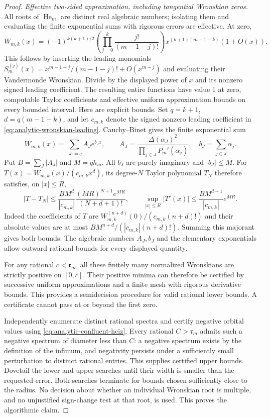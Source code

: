 \begin{proof}
\emph{Effective two-sided approximation, including tangential
Wronskian zeros.}
All roots of $\operatorname{He}_m$ are distinct real algebraic
numbers; isolating them and evaluating the finite exponential
sums with rigorous errors are effective. At zero,
\begin{equation}\label{eq:analytic-wronskian-leading}
 W_{m,k}(x)=(-1)^{k(k+1)/2}
 \left(\prod_{j=0}^k\frac{j!}{(m-1-j)!}\right)
 x^{(k+1)(m-1-k)}(1+O(x)).
\end{equation}
This follows by inserting the leading monomials
$S_m^{(j)}(x)=x^{m-1-j}/(m-1-j)!+O(x^{m-j})$ and evaluating
their Vandermonde Wronskian. Divide by the displayed power of $x$
and its nonzero signed leading coefficient. The resulting entire
functions have value $1$ at zero, computable Taylor coefficients
and effective uniform approximation bounds on every bounded
interval. Here are explicit bounds. Set $q=k+1$,
$d=q(m-1-k)$, and let $c_{m,k}$ denote the signed nonzero leading
coefficient in \eqref{eq:analytic-wronskian-leading}.
Cauchy--Binet gives the finite exponential sum
\[
 W_{m,k}(x)=\sum_{|J|=q} A_J e^{b_Jx},\qquad
 A_J=\frac{\Delta(\alpha_J)^2}{\prod_{j\in J}P_m'(\alpha_j)},
 \quad b_J=\sum_{j\in J}\alpha_j.
\]
Put $B=\sum_J|A_J|$ and $M=qh_m$. All $b_J$ are purely imaginary
and $|b_J|\le M$. For $T(x)=W_{m,k}(x)/(c_{m,k}x^d)$, its degree-$N$
Taylor polynomial $T_N$ therefore satisfies, on $|x|\le R$,
\[
 |T-T_N|\le\frac{BM^d}{|c_{m,k}|}
      \frac{(MR)^{N+1}e^{MR}}{(N+d+1)!},\qquad
 \sup_{|x|\le R}|T'(x)|
             \le\frac{BM^{d+1}}{|c_{m,k}|}e^{MR}.
\]
Indeed the coefficients of $T$ are
$W_{m,k}^{(n+d)}(0)/(c_{m,k}(n+d)!)$ and their absolute values are at
most $BM^{n+d}/(|c_{m,k}|(n+d)!)$. Summing this majorant gives both
bounds. The algebraic numbers $A_J,b_J$ and the elementary
exponentials allow outward rational bounds for every displayed
quantity.

For any rational $c<\mathfrak r_m$, all these finitely many
normalized Wronskians are strictly positive on $[0,c]$. Their
positive minima can therefore be certified by successive
uniform approximations and a finite mesh with rigorous
derivative bounds. This provides a semidecision procedure for
valid rational lower bounds. A certificate cannot pass at or
beyond the first zero.

Independently enumerate distinct rational spectra and certify
negative orbital values using \eqref{eq:analytic-confluent-hciz}.
Every rational $C>\mathfrak r_m$ admits such a negative spectrum
of diameter less than $C$: a negative spectrum exists by the
definition of the infimum, and negativity persists under a
sufficiently small perturbation to distinct rational entries.
This supplies certified upper bounds. Dovetail the lower and
upper searches until their width is smaller than the requested
error. Both searches terminate for bounds chosen sufficiently
close to the radius. No decision about whether an individual
Wronskian root is multiple, and no unjustified sign-change test
at that root, is used. This proves the algorithmic claim.
\end{proof}

